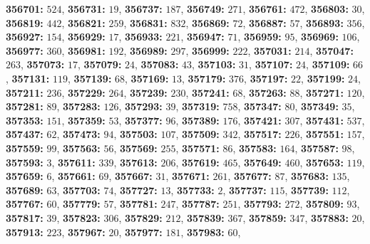 \textsf{\bfseries 356701:} $524$, \textsf{\bfseries 356731:} $19$, \textsf{\bfseries 356737:} $187$, \textsf{\bfseries 356749:} $271$, \textsf{\bfseries 356761:} $472$, \textsf{\bfseries 356803:} $30$, \textsf{\bfseries 356819:} $442$, \textsf{\bfseries 356821:} $259$, \textsf{\bfseries 356831:} $832$, \textsf{\bfseries 356869:} $72$, \textsf{\bfseries 356887:} $57$, \textsf{\bfseries 356893:} $356$, \textsf{\bfseries 356927:} $154$, \textsf{\bfseries 356929:} $17$, \textsf{\bfseries 356933:} $221$, \textsf{\bfseries 356947:} $71$, \textsf{\bfseries 356959:} $95$, \textsf{\bfseries 356969:} $106$, \textsf{\bfseries 356977:} $360$, \textsf{\bfseries 356981:} $192$, \textsf{\bfseries 356989:} $297$, \textsf{\bfseries 356999:} $222$, \textsf{\bfseries 357031:} $214$, \textsf{\bfseries 357047:} $263$, \textsf{\bfseries 357073:} $17$, \textsf{\bfseries 357079:} $24$, \textsf{\bfseries 357083:} $43$, \textsf{\bfseries 357103:} $31$, \textsf{\bfseries 357107:} $24$, \textsf{\bfseries 357109:} $66$, \textsf{\bfseries 357131:} $119$, \textsf{\bfseries 357139:} $68$, \textsf{\bfseries 357169:} $13$, \textsf{\bfseries 357179:} $376$, \textsf{\bfseries 357197:} $22$, \textsf{\bfseries 357199:} $24$, \textsf{\bfseries 357211:} $236$, \textsf{\bfseries 357229:} $264$, \textsf{\bfseries 357239:} $230$, \textsf{\bfseries 357241:} $68$, \textsf{\bfseries 357263:} $88$, \textsf{\bfseries 357271:} $120$, \textsf{\bfseries 357281:} $89$, \textsf{\bfseries 357283:} $126$, \textsf{\bfseries 357293:} $39$, \textsf{\bfseries 357319:} $758$, \textsf{\bfseries 357347:} $80$, \textsf{\bfseries 357349:} $35$, \textsf{\bfseries 357353:} $151$, \textsf{\bfseries 357359:} $53$, \textsf{\bfseries 357377:} $96$, \textsf{\bfseries 357389:} $176$, \textsf{\bfseries 357421:} $307$, \textsf{\bfseries 357431:} $537$, \textsf{\bfseries 357437:} $62$, \textsf{\bfseries 357473:} $94$, \textsf{\bfseries 357503:} $107$, \textsf{\bfseries 357509:} $342$, \textsf{\bfseries 357517:} $226$, \textsf{\bfseries 357551:} $157$, \textsf{\bfseries 357559:} $99$, \textsf{\bfseries 357563:} $56$, \textsf{\bfseries 357569:} $255$, \textsf{\bfseries 357571:} $86$, \textsf{\bfseries 357583:} $164$, \textsf{\bfseries 357587:} $98$, \textsf{\bfseries 357593:} $3$, \textsf{\bfseries 357611:} $339$, \textsf{\bfseries 357613:} $206$, \textsf{\bfseries 357619:} $465$, \textsf{\bfseries 357649:} $460$, \textsf{\bfseries 357653:} $119$, \textsf{\bfseries 357659:} $6$, \textsf{\bfseries 357661:} $69$, \textsf{\bfseries 357667:} $31$, \textsf{\bfseries 357671:} $261$, \textsf{\bfseries 357677:} $87$, \textsf{\bfseries 357683:} $135$, \textsf{\bfseries 357689:} $63$, \textsf{\bfseries 357703:} $74$, \textsf{\bfseries 357727:} $13$, \textsf{\bfseries 357733:} $2$, \textsf{\bfseries 357737:} $115$, \textsf{\bfseries 357739:} $112$, \textsf{\bfseries 357767:} $60$, \textsf{\bfseries 357779:} $57$, \textsf{\bfseries 357781:} $247$, \textsf{\bfseries 357787:} $251$, \textsf{\bfseries 357793:} $272$, \textsf{\bfseries 357809:} $93$, \textsf{\bfseries 357817:} $39$, \textsf{\bfseries 357823:} $306$, \textsf{\bfseries 357829:} $212$, \textsf{\bfseries 357839:} $367$, \textsf{\bfseries 357859:} $347$, \textsf{\bfseries 357883:} $20$, \textsf{\bfseries 357913:} $223$, \textsf{\bfseries 357967:} $20$, \textsf{\bfseries 357977:} $181$, \textsf{\bfseries 357983:} $60$, 

